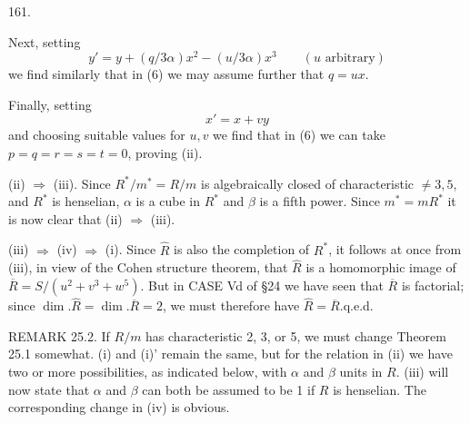161.

Next, setting
\[
y'=y+(q/3\alpha)x^2-(u/3\alpha)x^3\qquad(u\text{ arbitrary})
\]
we find similarly that in (6) we may assume further that $q=ux$.

Finally, setting
\[
x'=x+vy
\]
and choosing suitable values for $u,v$ we find that in (6) we can take $p=q=r=s=t=0$, proving (ii).

(ii) $\Rightarrow$ (iii). Since $R^*/m^*=R/m$ is algebraically closed of characteristic $\ne3,5$, and $R^*$ is henselian, $\alpha$ is a cube in $R^*$ and $\beta$ is a fifth power. Since $m^*=mR^*$ it is now clear that (ii) $\Rightarrow$ (iii).

(iii) $\Rightarrow$ (iv) $\Rightarrow$ (i). Since $\widehat R$ is also the completion of $R^*$, it follows at once from (iii), in view of the Cohen structure theorem, that $\widehat R$ is a homomorphic image of $\overline R=S/(u^2+v^3+w^5)$. But in CASE Vd of \S24 we have seen that $\overline R$ is factorial; since $\dim.\widehat R=\dim.\overline R=2$, we must therefore have $\widehat R=\overline R$.\qquad q.e.d.

REMARK 25.2. If $R/m$ has characteristic 2, 3, or 5, we must change Theorem 25.1 somewhat. (i) and (i)' remain the same, but for the relation in (ii) we have two or more possibilities, as indicated below, with $\alpha$ and $\beta$ units in $R$. (iii) will now state that $\alpha$ and $\beta$ can both be assumed to be 1 if $R$ is henselian. The corresponding change in (iv) is obvious.
